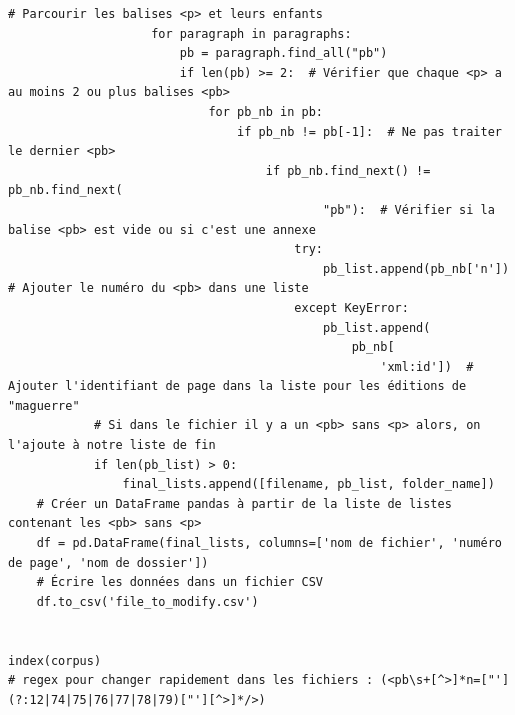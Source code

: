 \begin{lstlisting}[style=pythonStyle, caption=Script python pour trouver les fichiers xml avec les balises </p> manquantes]
                    # Parcourir les balises <p> et leurs enfants
                    for paragraph in paragraphs:
                        pb = paragraph.find_all("pb")
                        if len(pb) >= 2:  # Vérifier que chaque <p> a au moins 2 ou plus balises <pb>
                            for pb_nb in pb:
                                if pb_nb != pb[-1]:  # Ne pas traiter le dernier <pb>
                                    if pb_nb.find_next() != pb_nb.find_next(
                                            "pb"):  # Vérifier si la balise <pb> est vide ou si c'est une annexe
                                        try:
                                            pb_list.append(pb_nb['n'])  # Ajouter le numéro du <pb> dans une liste
                                        except KeyError:
                                            pb_list.append(
                                                pb_nb[
                                                    'xml:id'])  # Ajouter l'identifiant de page dans la liste pour les éditions de "maguerre"
            # Si dans le fichier il y a un <pb> sans <p> alors, on l'ajoute à notre liste de fin
            if len(pb_list) > 0:
                final_lists.append([filename, pb_list, folder_name])
    # Créer un DataFrame pandas à partir de la liste de listes contenant les <pb> sans <p>
    df = pd.DataFrame(final_lists, columns=['nom de fichier', 'numéro de page', 'nom de dossier'])
    # Écrire les données dans un fichier CSV
    df.to_csv('file_to_modify.csv')


index(corpus)
# regex pour changer rapidement dans les fichiers : (<pb\s+[^>]*n=["'](?:12|74|75|76|77|78|79)["'][^>]*/>)
\end{lstlisting}

\newpage

